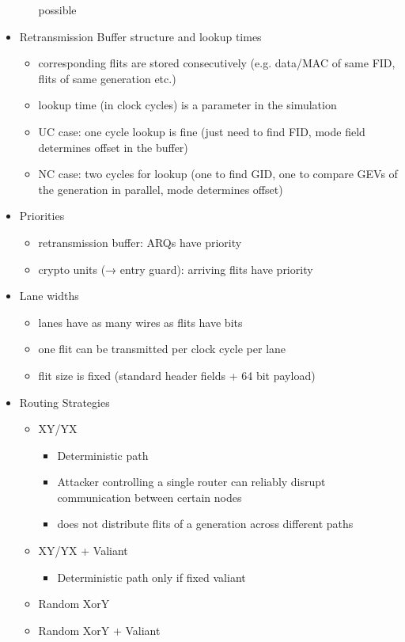 \documentclass[
	paper=a4,
	fontsize=11pt,
	parskip=full %
]{scrreprt}
\begin{document}
\begin{itemize}
\begin{itemize}
                    possible
            \end{itemize}
        \item Retransmission Buffer structure and lookup times
            \begin{itemize}
                \item corresponding flits are stored consecutively (e.g. data/MAC of same FID, flits of same generation etc.)
                \item lookup time (in clock cycles) is a parameter in the simulation
                \item UC case: one cycle lookup is fine (just need to find FID, mode field determines offset in the buffer)
                \item NC case: two cycles for lookup (one to find GID, one to compare GEVs of the generation in parallel, mode determines offset)
            \end{itemize}
        \item Priorities
            \begin{itemize}
                \item retransmission buffer: ARQs have priority
                \item crypto units (→ entry guard): arriving flits have priority
            \end{itemize}
        \item Lane widths
            \begin{itemize}
                \item lanes have as many wires as flits have bits
                \item one flit can be transmitted per clock cycle per lane
                \item flit size is fixed (standard header fields + 64 bit payload)
            \end{itemize}
        \item Routing Strategies
            \begin{itemize}
                \item XY/YX
                    \begin{itemize}
                        \item Deterministic path
                        \item Attacker controlling a single router can reliably disrupt communication between certain nodes
                        \item does not distribute flits of a generation across different paths
                    \end{itemize}
                \item XY/YX + Valiant
                    \begin{itemize}
                        \item Deterministic path only if fixed valiant
                    \end{itemize}
                \item Random XorY
                \item Random XorY + Valiant
            \end{itemize}
    \end{itemize}
\end{document}
